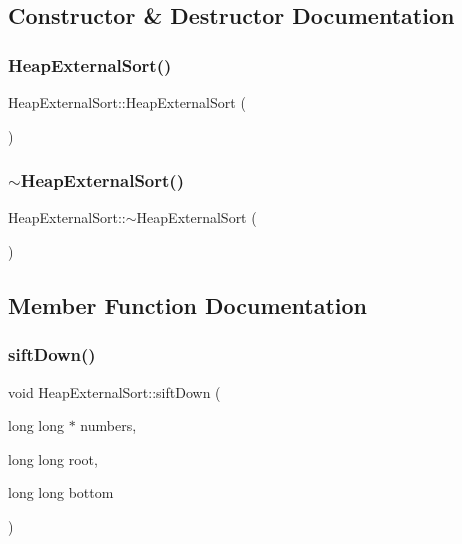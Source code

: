 \subsection{Constructor \& Destructor Documentation}
\hypertarget{class_heap_external_sort_a9e6236e47430f0b530b287a6d7cf3a8b}{}\label{class_heap_external_sort_a9e6236e47430f0b530b287a6d7cf3a8b} 
\subsubsection{\texorpdfstring{Heap\+External\+Sort()}{HeapExternalSort()}}
{\footnotesize\ttfamily Heap\+External\+Sort\+::\+Heap\+External\+Sort (\begin{DoxyParamCaption}{ }\end{DoxyParamCaption})}

\hypertarget{class_heap_external_sort_afa76473510a8cb610bb94bca5b5202c9}{}\label{class_heap_external_sort_afa76473510a8cb610bb94bca5b5202c9} 
\subsubsection{\texorpdfstring{$\sim$\+Heap\+External\+Sort()}{~HeapExternalSort()}}
{\footnotesize\ttfamily Heap\+External\+Sort\+::$\sim$\+Heap\+External\+Sort (\begin{DoxyParamCaption}{ }\end{DoxyParamCaption})}



\subsection{Member Function Documentation}
\hypertarget{class_heap_external_sort_a927eea9dcf44a9c7d53db1039bc7e21f}{}\label{class_heap_external_sort_a927eea9dcf44a9c7d53db1039bc7e21f} 
\subsubsection{\texorpdfstring{sift\+Down()}{siftDown()}}
{\footnotesize\ttfamily void Heap\+External\+Sort\+::sift\+Down (\begin{DoxyParamCaption}\item[{long long $\ast$}]{numbers,  }\item[{long long}]{root,  }\item[{long long}]{bottom }\end{DoxyParamCaption})\hspace{0.3cm}{\ttfamily [private]}}

